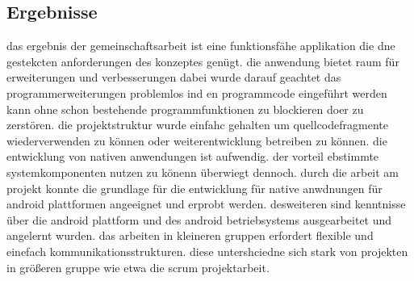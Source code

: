 \subsection{Ergebnisse}
das ergebnis der gemeinschaftsarbeit ist eine funktionsfähe applikation die dne gestekcten anforderungen des konzeptes genügt. die anwendung bietet raum für erweiterungen und verbesserungen dabei wurde darauf geachtet das programmerweiterungen problemlos ind en programmcode eingeführt werden kann ohne schon bestehende programmfunktionen zu blockieren doer zu zerstören.
die projektstruktur wurde einfahc gehalten um quellcodefragmente wiederverwenden zu können oder weiterentwicklung betreiben zu können. die entwicklung von nativen anwendungen ist aufwendig. der vorteil ebstimmte systemkomponenten nutzen zu könenn überwiegt dennoch.
durch die arbeit am projekt konnte die grundlage für die entwicklung für native anwdnungen für android plattformen angeeignet und erprobt werden. desweiteren sind kenntnisse über die android plattform und des android betriebsystems ausgearbeitet und angelernt wurden. das arbeiten in kleineren gruppen erfordert flexible und einefach kommunikationsstrukturen. diese untershciedne sich stark von projekten in größeren gruppe wie etwa die scrum projektarbeit.